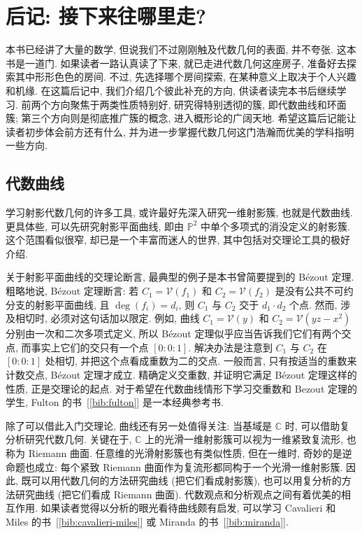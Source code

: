 \chapter*{后记: 接下来往哪里走?}\label{chap:coda}
\setcounter{equation}{0}
\renewcommand{\theequation}{C.\arabic{equation}}
\renewcommand{\theHequation}{coda.\arabic{equation}}

本书已经讲了大量的数学, 但说我们不过刚刚触及代数几何的表面, 并不夸张. 这本书是一道门. 如果读者一路认真读了下来, 就已走进代数几何这座房子, 准备好去探索其中形形色色的房间. 不过, 先选择哪个房间探索, 在某种意义上取决于个人兴趣和机缘. 在这篇后记中, 我们介绍几个彼此补充的方向, 供读者读完本书后继续学习. 前两个方向聚焦于两类性质特别好, 研究得特别透彻的簇, 即代数曲线和环面簇; 第三个方向则是彻底推广簇的概念, 进入概形论的广阔天地. 希望这篇后记能让读者初步体会前方还有什么, 并为进一步掌握代数几何这门浩瀚而优美的学科指明一些方向.

\section*{代数曲线}

学习射影代数几何的许多工具, 或许最好先深入研究一维射影簇, 也就是代数曲线. 更具体些, 可以先研究射影平面曲线, 即由 $\mathbb{P}^{2}$ 中单个多项式的消没定义的射影簇. 这个范围看似很窄, 却已是一个丰富而迷人的世界, 其中包括对交理论工具的极好介绍.

关于射影平面曲线的交理论断言, 最典型的例子是本书曾简要提到的 Bézout 定理. 粗略地说, Bézout 定理断言: 若 $C_{1}=\mathcal{V}(f_{1})$ 和 $C_{2}=\mathcal{V}(f_{2})$ 是没有公共不可约分支的射影平面曲线, 且 $\deg(f_{i})=d_{i}$, 则 $C_{1}$ 与 $C_{2}$ 交于 $d_{1}\cdot d_{2}$ 个点. 然而, 涉及相切时, 必须对这句话加以限定. 例如, 曲线 $C_{1}=\mathcal{V}(y)$ 和 $C_{2}=\mathcal{V}(yz-x^{2})$ 分别由一次和二次多项式定义, 所以 Bézout 定理似乎应当告诉我们它们有两个交点, 而事实上它们的交只有一个点 $[0:0:1]$. 解决办法是注意到 $C_{1}$ 与 $C_{2}$ 在 $[0:0:1]$ 处相切, 并把这个点看成\textquotedbl{}重数\textquotedbl{}为二的交点. 一般而言, 只有按适当的重数来计数交点, Bézout 定理才成立. 精确定义交重数, 并证明它满足 Bézout 定理这样的性质, 正是交理论的起点. 对于希望在代数曲线情形下学习交重数和 Bezout 定理的学生, Fulton 的书~[\ref{bib:fulton}] 是一本经典参考书.

除了可以借此入门交理论, 曲线还有另一处值得关注: 当基域是 $\mathbb{C}$ 时, 可以借助复分析研究代数几何. 关键在于, $\mathbb{C}$ 上的光滑一维射影簇可以视为一维紧致复流形, 也称为 Riemann 曲面. 任意维的光滑射影簇也有类似性质, 但在一维时, 奇妙的是逆命题也成立: 每个紧致 Riemann 曲面作为复流形都同构于一个光滑一维射影簇. 因此, 既可以用代数几何的方法研究曲线 (把它们看成射影簇), 也可以用复分析的方法研究曲线 (把它们看成 Riemann 曲面). 代数观点和分析观点之间有着优美的相互作用. 如果读者觉得以分析的眼光看待曲线颇有启发, 可以学习 Cavalieri 和 Miles 的书~[\ref{bib:cavalieri-miles}] 或 Miranda 的书~[\ref{bib:miranda}].

